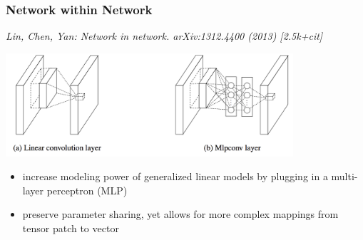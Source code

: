 \documentclass[compress]{beamer}
\newcommand{\is}[1]{\setlength{\itemsep}{#1}}
\begin{document}
\begin{frame} \frametitle{Network within Network}
{\small \textit{Lin, Chen, Yan: Network in network. arXiv:1312.4400 (2013) [2.5k+cit]}}
\begin{center}
\includegraphics[width=0.8\textwidth]{./figures/netinnet.png}
\end{center}

\begin{itemize} \is{2mm}
\item increase modeling power of generalized linear models by plugging in a multi-layer perceptron (MLP)
\item preserve parameter sharing, yet allows for more complex mappings from tensor patch to vector
\end{itemize}
\end{frame}
\end{document}
